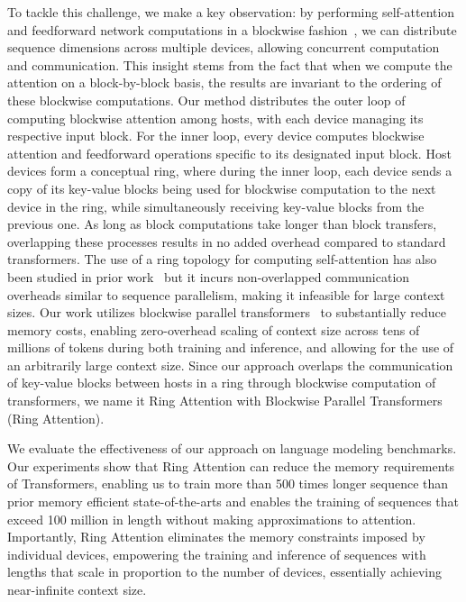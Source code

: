 \documentclass{article}
\newcommand{\oursabb}{{Ring Attention}\xspace}
\begin{document}
To tackle this challenge, we make a key observation: by performing self-attention and feedforward network computations in a blockwise fashion~\citep{liu2023blockwise}, we can distribute sequence dimensions across multiple devices, allowing concurrent computation and communication.
This insight stems from the fact that when we compute the attention on a block-by-block basis, the results are invariant to the ordering of these blockwise computations.
Our method distributes the outer loop of computing blockwise attention among hosts, with each device managing its respective input block. For the inner loop, every device computes blockwise attention and feedforward operations specific to its designated input block.
Host devices form a conceptual ring, where during the inner loop, each device sends a copy of its key-value blocks being used for blockwise computation to the next device in the ring, while simultaneously receiving key-value blocks from the previous one.
As long as block computations take longer than block transfers, overlapping these processes results in no added overhead compared to standard transformers.
The use of a ring topology for computing self-attention has also been studied in prior work~\citep{li2021sequence} but it incurs non-overlapped communication overheads similar to sequence parallelism, making it infeasible for large context sizes. Our work utilizes blockwise parallel transformers~\citep{liu2023blockwise} to substantially reduce memory costs, enabling zero-overhead scaling of context size across tens of millions of tokens during both training and inference, and allowing for the use of an arbitrarily large context size.
Since our approach overlaps the communication of key-value blocks between hosts in a ring through blockwise computation of transformers, we name it Ring Attention with Blockwise Parallel Transformers (\oursabb).

We evaluate the effectiveness of our approach on language modeling benchmarks. Our experiments show that \oursabb can reduce the memory requirements of Transformers, enabling us to train more than 500 times longer sequence than prior memory efficient state-of-the-arts and enables the training of sequences that exceed 100 million in length without making approximations to attention. Importantly, \oursabb eliminates the memory constraints imposed by individual devices, empowering the training and inference of sequences with lengths that scale in proportion to the number of devices, essentially achieving near-infinite context size.
\end{document}
